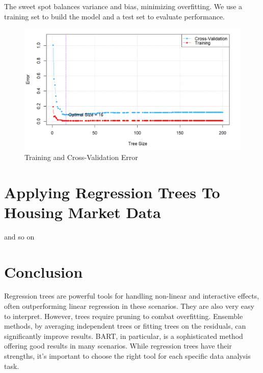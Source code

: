 \documentclass[12pt]{article}
\begin{document}
The sweet spot balances variance and bias, minimizing overfitting. We use a training set to build the model and a test set to evaluate performance.


\begin{figure}
    \centering
    \includegraphics[scale=0.40]{Pruning.png}
    \caption{Training and Cross-Validation Error}
    \label{fig:sub10}  %
\end{figure}




\section{Applying Regression Trees To Housing Market Data}


and so on






 \section{Conclusion}
Regression trees are powerful tools for handling non-linear and interactive effects, often outperforming linear regression in these scenarios. They are also very easy to interpret. However, trees require pruning to combat overfitting. Ensemble methods, by averaging independent trees or fitting trees on the residuals, can significantly improve results. BART, in particular, is a sophisticated method offering good results in many scenarios. While regression trees have their strengths, it's important to choose the right tool for each specific data analysis task.
\end{document}
